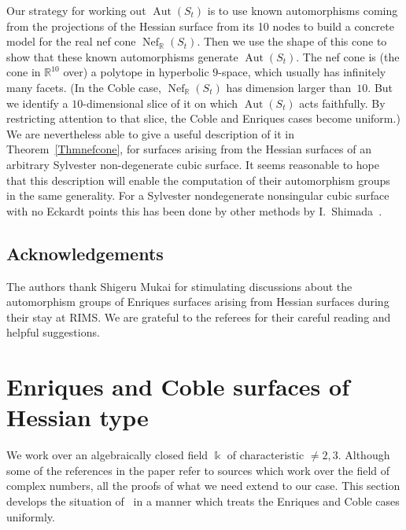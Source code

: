\documentclass[11pt]{article}
\theoremstyle{definition}
\numberwithin{equation}{section}
\numberwithin{figure}{section}
\numberwithin{table}{section}
\newcommand{\bbR}{{\mathbb{R}}}
\DeclareMathOperator{\Aut}{Aut}
\DeclareMathOperator{\Nef}{Nef}
\begin{document}
Our strategy for working out $\Aut(S_t)$ is to use known automorphisms coming from the projections of the Hessian surface from its 10 nodes to build a concrete model for the real nef cone $\Nef_\bbR(S_t)$. Then we use the shape of this cone to show that these known automorphisms generate $\Aut(S_t)$. The nef cone is (the cone in $\bbR^{10}$ over) a polytope in hyperbolic $9$-space, which usually has infinitely many facets. (In the Coble case, $\Nef_\bbR(S_t)$ has dimension larger than~$10$. But we identify a $10$-dimensional slice of it on which $\Aut(S_t)$ acts faithfully. By restricting attention to that slice, the Coble and Enriques cases become uniform.) We are nevertheless able to give a useful description of it in Theorem~\ref{Thmnefcone}, for surfaces arising from the Hessian surfaces of an arbitrary Sylvester non-degenerate cubic surface. It seems reasonable to hope that this description will enable the computation of their automorphism groups in the same generality. For a Sylvester nondegenerate nonsingular cubic surface with no Eckardt points this has been done by other methods by I.~Shimada~\cite{Shimada}.



\subsection*{Acknowledgements}
The authors thank Shigeru Mukai for stimulating discussions about the automorphism groups of Enriques surfaces arising from Hessian surfaces during their stay at RIMS. We are grateful to the referees for their careful reading and helpful suggestions.


\section{Enriques and Coble surfaces of Hessian type}\label{SecBackground}

We work over an algebraically closed field $\Bbbk$ of characteristic $\ne 2,3$. Although some of the references in the paper refer to sources which work over the field of complex numbers, all the proofs of what we need extend to our case. This section develops the situation of~\cite{DolgachevSalem} in a manner which treats the Enriques and Coble cases uniformly.
\end{document}
